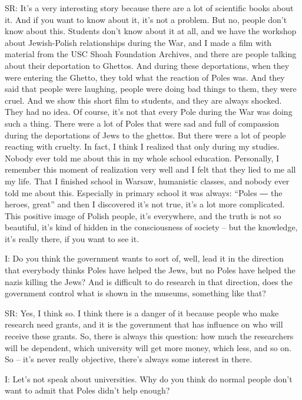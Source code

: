 SR: It’s a very interesting story because there are a lot of scientific books about it. And if you want to know about it, it’s not a problem. But no, people don’t know about this. Students don’t know about it at all, and we have the workshop about Jewish-Polish relationships during the War, and I made a film with material from the USC Shoah Foundation Archives, and there are people talking about their deportation to Ghettos. And during these deportations, when they were entering the Ghetto, they told what the reaction of Poles was. And they said that people were laughing, people were doing bad things to them, they were cruel. And we show this short film to students, and they are always shocked. They had no idea. Of course, it’s not that every Pole during the War was doing such a thing. There were a lot of Poles that were sad and full of compassion during the deportations of Jews to the ghettos. But there were a lot of people reacting with cruelty. In fact, I think I realized that only during my studies. Nobody ever told me about this in my whole school education. Personally, I remember this moment of realization very well and I felt that they lied to me all my life. That I finished school in Warsaw, humanistic classes, and nobody ever told me about this. Especially in primary school it was always: “Poles ― the heroes, great” and then I discovered it’s not true, it’s a lot more complicated. This positive image of Polish people, it’s everywhere, and the truth is not so beautiful, it’s kind of hidden in the consciousness of society – but the knowledge, it’s really there, if you want to see it. 

 

I: Do you think the government wants to sort of, well, lead it in the direction that everybody thinks Poles have helped the Jews, but no Poles have helped the nazis killing the Jews? And is difficult to do research in that direction, does the government control what is shown in the museums, something like that? 

 

SR: Yes, I think so. I think there is a danger of it because people who make research need grants, and it is the government that has influence on who will receive these grants. So, there is always this question: how much the researchers will be dependent, which university will get more money, which less, and so on. So – it’s never really objective, there’s always some interest in there. 

 

I: Let’s not speak about universities. Why do you think do normal people don’t want to admit that Poles didn’t help enough? 

